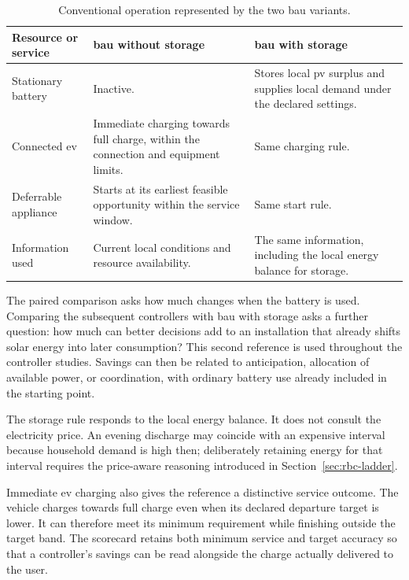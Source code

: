 \begin{table}[htbp]
\centering
\caption{Conventional operation represented by the two \gls{bau} variants.}
\label{tab:control-bau-variants}
\small
\begin{tabularx}{\textwidth}{@{}p{}XX@{}}
\toprule
\textbf{Resource or service} & \textbf{\gls{bau} without storage} & \textbf{\gls{bau} with storage}\\
\midrule
Stationary battery & Inactive. & Stores local \gls{pv} surplus and supplies local demand under the declared settings.\\
\addlinespace
Connected \gls{ev} & Immediate charging towards full charge, within the connection and equipment limits. & Same charging rule.\\
\addlinespace
Deferrable appliance & Starts at its earliest feasible opportunity within the service window. & Same start rule.\\
\addlinespace
Information used & Current local conditions and resource availability. & The same information, including the local energy balance for storage.\\
\bottomrule
\end{tabularx}
\end{table}

The paired comparison asks how much changes when the battery is used. Comparing the subsequent controllers with \gls{bau} with storage asks a further question: how much can better decisions add to an installation that already shifts solar energy into later consumption? This second reference is used throughout the controller studies. Savings can then be related to anticipation, allocation of available power, or coordination, with ordinary battery use already included in the starting point.

The storage rule responds to the local energy balance. It does not consult the electricity price. An evening discharge may coincide with an expensive interval because household demand is high then; deliberately retaining energy for that interval requires the price-aware reasoning introduced in Section~\ref{sec:rbc-ladder}.

Immediate \gls{ev} charging also gives the reference a distinctive service outcome. The vehicle charges towards full charge even when its declared departure target is lower. It can therefore meet its minimum requirement while finishing outside the target band. The scorecard retains both minimum service and target accuracy so that a controller's savings can be read alongside the charge actually delivered to the user.

